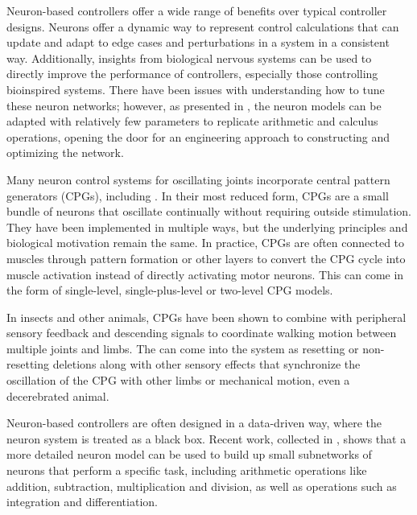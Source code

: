 
Neuron-based controllers offer a wide range of benefits over typical controller
designs. Neurons offer a dynamic way to represent control calculations that can
update and adapt to edge cases and perturbations in a system in a consistent 
way. Additionally, insights from biological nervous systems can be used to 
directly improve the performance of controllers, especially those controlling 
bioinspired systems. There have been issues with understanding how
to tune these neuron networks; however, as presented in 
\cite{NickFunctionalSubnetwork}, the neuron models can be adapted with 
relatively few parameters to replicate arithmetic and calculus operations, 
opening the door for an engineering approach to constructing and optimizing the
network.


Many neuron control systems for oscillating joints incorporate central pattern
generators (CPGs), including 
\cite{Narioka2012, EventBasedWalking, HuntHindLegWalking, HuntPhDThesis}.
In their most reduced form, CPGs are a small bundle of
neurons that oscillate continually without requiring outside stimulation. They
have been implemented in multiple ways, but the underlying principles and 
biological motivation remain the same.
\cite{CPGReview}
In
practice, CPGs are often connected to muscles through pattern formation or other
layers to convert the CPG cycle into muscle activation instead of directly
activating motor neurons. This can come in the form of single-level,
single-plus-level or two-level CPG models. \cite{MultiLevelCPG}

In insects and other animals, CPGs have been shown to combine with peripheral 
sensory feedback and
descending signals to coordinate walking motion between multiple joints and
limbs. The can come into the system as resetting or non-resetting deletions
along with other sensory effects that synchronize the oscillation of the CPG
with other limbs or mechanical motion, even a decerebrated animal.
\cite{SixLeggedWalking, CPGReview}


Neuron-based controllers are often designed in a data-driven way, where the
neuron system is treated as a black box. Recent work, collected in 
\cite{NickFunctionalSubnetwork}, shows that a more detailed neuron model can be
used to build up small subnetworks of neurons that perform a specific task,
including arithmetic operations like addition, subtraction, multiplication and
division, as well as operations such as integration and differentiation.

